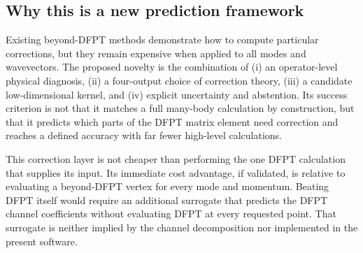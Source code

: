 \subsection{Why this is a new prediction framework}

Existing beyond-DFPT methods demonstrate how to compute particular corrections,
but they remain expensive when applied to all modes and wavevectors.  The proposed
novelty is the combination of (i) an operator-level physical diagnosis, (ii) a
four-output choice of correction theory, (iii) a candidate low-dimensional
kernel, and (iv) explicit uncertainty and abstention.  Its success criterion is
not that it matches a full many-body calculation by construction, but that it
predicts which parts of the DFPT matrix element need correction and reaches a
defined accuracy with far fewer high-level calculations.

This correction layer is not cheaper than performing the one DFPT calculation
that supplies its input.  Its immediate cost advantage, if validated, is relative
to evaluating a beyond-DFPT vertex for every mode and momentum.  Beating DFPT
itself would require an additional surrogate that predicts the DFPT channel
coefficients without evaluating DFPT at every requested point.  That surrogate
is neither implied by the channel decomposition nor implemented in the present
software.
